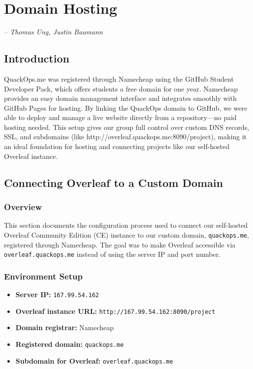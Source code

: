 \chapter{Domain Hosting}

\small{\textit{-- Thomas Ung, Justin Baumann}}
\label{Chapter:DomainHosting}

\section{Introduction}

QuackOps.me was registered through Namecheap using the GitHub Student Developer Pack, which offers students a free domain for one year. Namecheap provides an easy domain management interface and integrates smoothly with GitHub Pages for hosting. By linking the QuackOps domain to GitHub, we were able to deploy and manage a live website directly from a repository—no paid hosting needed. This setup gives our group full control over custom DNS records, SSL, and subdomains (like http://overleaf.quackops.me:8090/project), making it an ideal foundation for hosting and connecting projects like our self-hosted Overleaf instance.

\section{Connecting Overleaf to a Custom Domain}

\subsection{Overview}
This section documents the configuration process used to connect our self-hosted Overleaf Community Edition (CE) instance to our custom domain, \texttt{quackops.me}, registered through Namecheap. The goal was to make Overleaf accessible via \texttt{overleaf.quackops.me} instead of using the server IP and port number.

\subsection{Environment Setup}
\begin{itemize}
  \item \textbf{Server IP:} \texttt{167.99.54.162}
  \item \textbf{Overleaf instance URL:} \texttt{http://167.99.54.162:8090/project}
  \item \textbf{Domain registrar:} Namecheap
  \item \textbf{Registered domain:} \texttt{quackops.me}
  \item \textbf{Subdomain for Overleaf:} \texttt{overleaf.quackops.me}
\end{itemize}

